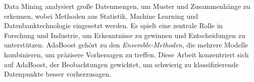 Data Mining analysiert große Datenmengen, um Muster und Zusammenhänge zu erkennen,
wobei Methoden aus Statistik, Machine Learning und Datenbanktechnologie eingesetzt werden.
Es spielt eine zentrale Rolle in Forschung und Industrie, um Erkenntnisse zu gewinnen und
Entscheidungen zu unterstützen. AdaBoost gehört zu den
\emph{Ensemble-Methoden}, die mehrere Modelle kombinieren, um präzisere Vorhersagen zu treffen.
Diese Arbeit konzentriert sich auf AdaBoost, der Beobachtungen gewichtet, um schwierig zu
klassifizierende Datenpunkte besser vorherzusagen.